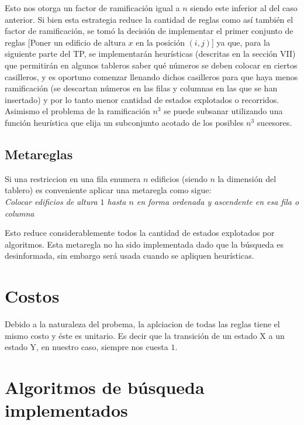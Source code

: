 \documentclass[%
	final,
	reprint,
	notitlepage,
	narroweqnarray,
	inline,
	twoside,
	invited
	]{ieee}
\begin{document}
\par Esto nos otorga un factor de ramificación igual a $n$ siendo este inferior al del caso anterior. Si bien esta estrategia reduce la cantidad de reglas como así también el factor de ramificación, se tomó la decisión de implementar el primer conjunto de reglas [Poner un edificio de altura $x$ en la posición $(i,j)$] ya que, para la siguiente parte del TP, 
se implementarán heurísticas (descritas en la sección VII) que permitirán en algunos tableros saber qué números se deben colocar en ciertos casilleros, y es oportuno comenzar llenando dichos casilleros para que haya menos ramificación
 (se descartan números en las filas  y columnas en las que se han insertado) y por lo tanto 
menor cantidad de estados explotados o recorridos. Asimismo el problema de la ramificación $n^3$ se puede subsanar utilizando una función heurística que elija un subconjunto acotado de los posibles $n^3$ sucesores.




\subsection{Metareglas}

\par Si una restriccion en una fila enumera $n$ edificios (siendo $n$ la dimensión del tablero) es conveniente aplicar una metaregla como sigue:\\

\emph{Colocar edificios de altura $1$ hasta $n$ en forma ordenada y ascendente en esa fila o columna}\\

\par Esto reduce considerablemente todos la cantidad de estados explotados por  algoritmos. Esta metaregla no ha sido implementada dado que 
la búsqueda es desinformada, sin embargo será usada cuando se apliquen heurísticas.

\section{Costos}

\par Debido a la naturaleza del probema, la aplciacion de todas las reglas tiene el mismo costo y éste es unitario. Es decir que la transición de un estado X a un estado Y, en nuestro caso, siempre nos cuesta $1$.

\section{Algoritmos de búsqueda implementados}
\end{document}
